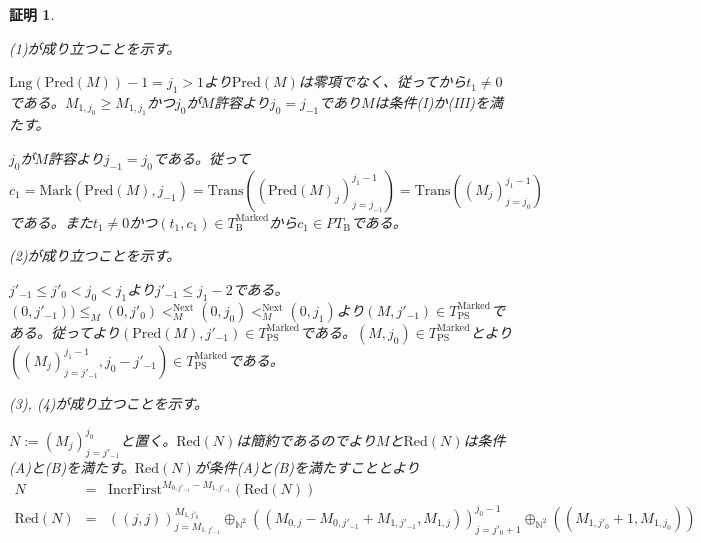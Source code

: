 \documentclass[dvipdfmx,uplatex]{jsarticle}
\theoremstyle{customnonumberbreakfortheorem}
\theoremstyle{customnonumberbreakforproof}
\newtheorem{hideableproof}{証明}
\begin{document}
\begin{hideableproof}
	\begin{indented}
		\item (1)が成り立つことを示す。
	\end{indented}
	\(\textrm{Lng}(\textrm{Pred}(M))-1 = j_1 > 1\)より\(\textrm{Pred}(M)\)は零項でなく、従ってから\(t_1 \neq 0\)である。\(M_{1,j_0} \geq M_{1,j_1}\)かつ\(j_0\)が\(M\)許容より\(j_0 = j_{-1}\)であり\(M\)は条件(I)か(III)を満たす。
	\begin{indented}
		\item \(j_0\)が\(M\)許容より\(j_{-1} = j_0\)である。従って\(c_1 = \textrm{Mark}(\textrm{Pred}(M),j_{-1}) = \textrm{Trans}((\textrm{Pred}(M)_j)_{j=j_{-1}}^{j_1-1}) = \textrm{Trans}((M_j)_{j=j_0}^{j_1-1})\)である。また\(t_1 \neq 0\)かつ\((t_1,c_1) \in T_{\textrm{B}}^{\textrm{Marked}}\)から\(c_1 \in PT_{\textrm{B}}\)である。
		\item
		\item (2)が成り立つことを示す。
	\end{indented}
	\(j'_{-1} \leq j'_0 < j_0 < j_1\)より\(j'_{-1} \leq j_1-2\)である。\((0,j'_{-1})) \leq_M (0,j'_0) <_M^{\textrm{Next}} (0,j_0) <_M^{\textrm{Next}} (0,j_1)\)より\((M,j'_{-1}) \in T_{\textrm{PS}}^{\textrm{Marked}}\)である。従ってより\((\textrm{Pred}(M),j'_{-1}) \in T_{\textrm{PS}}^{\textrm{Marked}}\)である。\((M,j_0) \in T_{\textrm{PS}}^{\textrm{Marked}}\)とより\(((M_j)_{j=j'_{-1}}^{j_1-1},j_0-j'_{-1}) \in T_{\textrm{PS}}^{\textrm{Marked}}\)である。
	\begin{indented}
		\item
		\item (3), (4)が成り立つことを示す。
	\end{indented}
	\(N := (M_j)_{j=j'_{-1}}^{j_0}\)と置く。\(\textrm{Red}(N)\)は簡約であるのでより\(M\)と\(\textrm{Red}(N)\)は条件(A)と(B)を満たす。\(\textrm{Red}(N)\)が条件(A)と(B)を満たすこととより
	\begin{eqnarray*}
	N & = & \textrm{IncrFirst}^{M_{0,j'_{-1}}-M_{1,j'_{-1}}}(\textrm{Red}(N)) \\
	\textrm{Red}(N) & = & ((j,j))_{j=M_{1,j'_{-1}}}^{M_{1,j'_0}} \oplus_{\mathbb{N}^2} ((M_{0,j}-M_{0,j'_{-1}}+M_{1,j'_{-1}},M_{1,j}))_{j=j'_0+1}^{j_0-1} \oplus_{\mathbb{N}^2} ((M_{1,j'_0}+1,M_{1,j_0})) 
	\end{eqnarray*}
	\begin{indented}

\end{indented}
\end{hideableproof}
\end{document}

